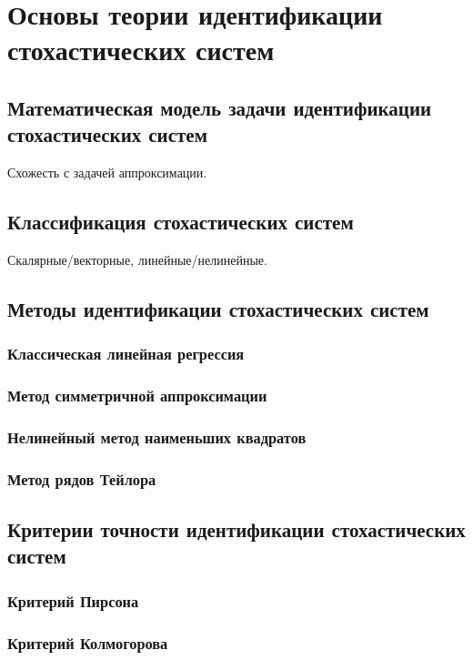 \chapter[Основы теории идентификации стохастических систем]{%
  Основы теории идентификации стохастических систем
}

\section{Математическая модель задачи идентификации стохастических систем}

Схожесть с задачей аппроксимации.

\section{Классификация стохастических систем}

Скалярные/векторные, линейные/нелинейные.

\section{Методы идентификации стохастических систем}

\subsection{Классическая линейная регрессия}

\subsection{Метод симметричной аппроксимации}

\subsection{Нелинейный метод наименьших квадратов}

\subsection{Метод рядов Тейлора}

\section{Критерии точности идентификации стохастических систем}

\subsection{Критерий Пирсона}

\subsection{Критерий Колмогорова}

